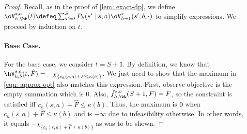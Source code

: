 \documentclass[pdftex, a4paper, 12pt]{article}
\newcommand{\hf}{\hat{f}}
\newcommand{\hF}{\hat{F}}
\begin{document}
\begin{proof}
    Recall, as in the proof of \cref{lem: exact-dp}, we define $\oV^{s,a}_{h,\bb}(t) \defeq \sum_{s' = t}^S P_h(s' \mid s,a) \oV^*_{h+1}(s', b_{s'})$ to simplify expressions.
    We proceed by induction on $t$. 

    \paragraph{Base Case.} For the base case, we consider $t = S+1$. By definition, we know that $\hV_{h,b}^{s,a}(t,\hF) = -\chi_{\{c_h(s,a) + \hF \leq \kappa(b)\}}$. We just need to show that the maximum in \eqref{equ: approx-opt} also matches this expression. First, observe objective is the empty summation which is $0$. Also, $\hf_{h, \bb}^{s,a}(S+1,F) = F$, so the constraint is satisfied iff $c_h(s,a) + \hF \leq \kappa(b)$. Thus, the maximum is $0$ when $c_h(s,a) + \hF \leq \kappa(b)$ and is $-\infty$ due to infeasibility otherwise. In other words, it equals $-\chi_{\{c_h(s,a) + \hF \leq \kappa(b)\}}$ as was to be shown.


\end{proof}
\end{document}
